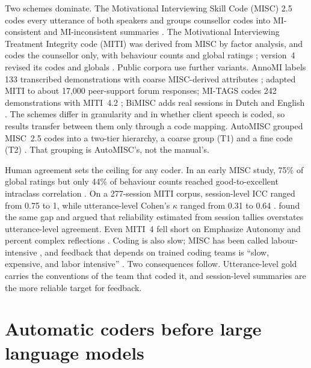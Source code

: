 Two schemes dominate. The Motivational Interviewing Skill Code (MISC) 2.5 codes every utterance of both speakers and groups counsellor codes into MI-consistent and MI-inconsistent summaries \citep{houck2010misc}. The Motivational Interviewing Treatment Integrity code (MITI) was derived from MISC by factor analysis, and codes the counsellor only, with behaviour counts and global ratings \citep{moyers2005miti}; version~4 revised its codes and globals \citep{moyers2016miti4}. Public corpora use further variants. AnnoMI labels 133 transcribed demonstrations with coarse MISC-derived attributes \citep{wu2022annomi,wu2023annomi}; \citet{welivita2022curating} adapted MITI to about 17,000 peer-support forum responses; MI-TAGS codes 242 demonstrations with MITI~4.2 \citep{cohen2024mitags}; BiMISC adds real sessions in Dutch and English \citep{sun2024bimisc}. The schemes differ in granularity and in whether client speech is coded, so results transfer between them only through a code mapping. AutoMISC grouped MISC~2.5 codes into a two-tier hierarchy, a coarse group (T1) and a fine code (T2) \citep{ali2025automisc}. That grouping is AutoMISC's, not the manual's.

Human agreement sets the ceiling for any coder. In an early MISC study, 75\% of global ratings but only 44\% of behaviour counts reached good-to-excellent intraclass correlation \citep{moyers2003misc}. On a 277-session MITI corpus, session-level ICC ranged from 0.75 to 1, while utterance-level Cohen's $\kappa$ ranged from 0.31 to 0.64 \citep{perezrosas2016building}. \citet{lord2015advancing} found the same gap and argued that reliability estimated from session tallies overstates utterance-level agreement. Even MITI~4 fell short on Emphasize Autonomy and percent complex reflections \citep{moyers2016miti4}. Coding is also slow; MISC has been called labour-intensive \citep{dejonge2005misc}, and feedback that depends on trained coding teams is ``slow, expensive, and labor intensive'' \citep{imel2019design}. Two consequences follow. Utterance-level gold carries the conventions of the team that coded it, and session-level summaries are the more reliable target for feedback.

\section{Automatic coders before large language models}
\label{sec:rw-classic}

